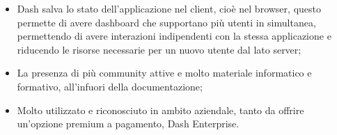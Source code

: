 \begin{itemize}
\item Dash salva lo stato dell'applicazione nel client, cioè nel browser, questo permette di avere dashboard che supportano più utenti in simultanea, permettendo di avere interazioni indipendenti con la stessa applicazione e riducendo le risorse necessarie per un nuovo utente dal lato server;

\item La presenza di più community attive e molto materiale informatico e formativo, all'infuori della documentazione;

\item Molto utilizzato e riconosciuto in ambito aziendale, tanto da offrire un'opzione premium a pagamento, Dash Enterprise.

\end{itemize}

